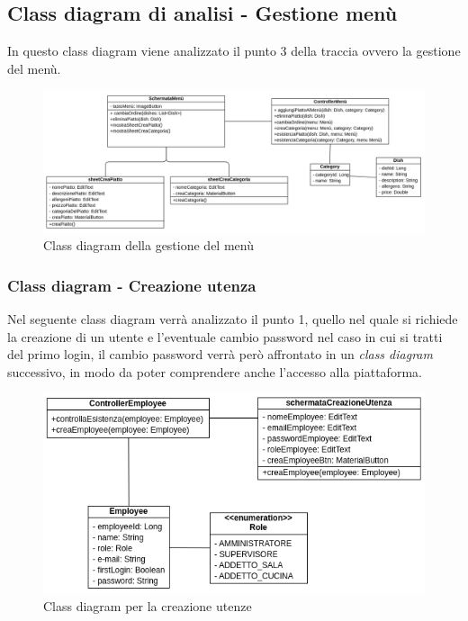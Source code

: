 \subsection{Class diagram di analisi - Gestione menù}
In questo class diagram viene analizzato il punto 3 della traccia ovvero la gestione del menù.
\begin{figure}[H]
  \centering
  \includegraphics[scale=0.55]{img/class_diagrams/gestioneMenu_class_diagram.png}
  \caption{Class diagram della gestione del menù}
\end{figure}
\newpage
\subsubsection{Class diagram - Creazione utenza}
Nel seguente class diagram verrà analizzato il punto 1, quello nel quale si richiede la creazione di un utente e l'eventuale cambio password nel caso in cui si tratti del primo login, il cambio password verrà però affrontato in un \textit{class diagram} successivo, in modo da poter comprendere anche l'accesso alla piattaforma.

\begin{figure}[H]
  \centering
  \includegraphics[scale=0.75]{img/class_diagrams/creazioneUtenza_class_diagram.png}
  \caption{Class diagram per la creazione utenze}
\end{figure}
